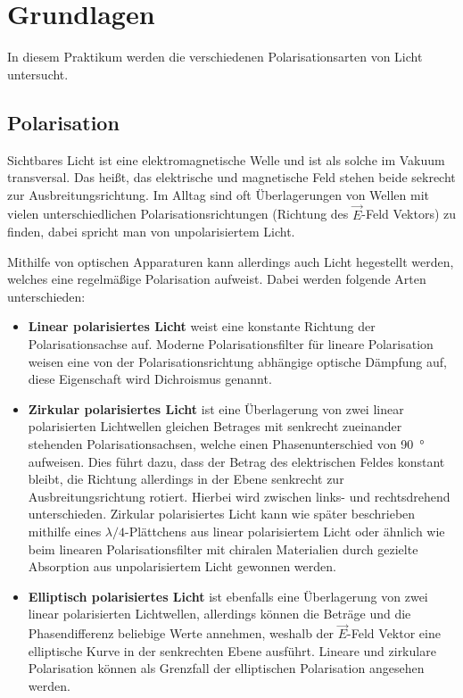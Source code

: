 \chapter{Grundlagen}

In diesem Praktikum werden die verschiedenen Polarisationsarten von Licht untersucht.

\section{Polarisation}

Sichtbares Licht ist eine elektromagnetische Welle und ist als solche im Vakuum transversal.
Das heißt, das elektrische und magnetische Feld stehen beide sekrecht zur Ausbreitungsrichtung.
Im Alltag sind oft Überlagerungen von Wellen mit vielen unterschiedlichen Polarisationsrichtungen (Richtung des $\vec{E}$-Feld Vektors) zu finden, dabei spricht man von unpolarisiertem Licht.

Mithilfe von optischen Apparaturen kann allerdings auch Licht hegestellt werden, welches eine regelmäßige Polarisation aufweist.
Dabei werden folgende Arten unterschieden:

\begin{itemize}
	\item \textbf{Linear polarisiertes Licht} weist eine konstante Richtung der Polarisationsachse auf.
	Moderne Polarisationsfilter für lineare Polarisation weisen eine von der Polarisationsrichtung abhängige optische Dämpfung auf, diese Eigenschaft wird Dichroismus genannt.
	\item \textbf{Zirkular polarisiertes Licht} ist eine Überlagerung von zwei linear polarisierten Lichtwellen gleichen Betrages mit senkrecht zueinander stehenden Polarisationsachsen, welche einen Phasenunterschied von \SI{90}{\degree} aufweisen.
	Dies führt dazu, dass der Betrag des elektrischen Feldes konstant bleibt, die Richtung allerdings in der Ebene senkrecht zur Ausbreitungsrichtung rotiert.
	Hierbei wird zwischen links- und rechtsdrehend unterschieden.
	Zirkular polarisiertes Licht kann wie später beschrieben mithilfe eines $\lambda / 4$-Plättchens aus linear polarisiertem Licht oder ähnlich wie beim linearen Polarisationsfilter mit chiralen Materialien durch gezielte Absorption aus unpolarisiertem Licht gewonnen werden.
	\item \textbf{Elliptisch polarisiertes Licht} ist ebenfalls eine Überlagerung von zwei linear polarisierten Lichtwellen, allerdings können die Beträge und die Phasendifferenz beliebige Werte annehmen, weshalb der $\vec{E}$-Feld Vektor eine elliptische Kurve in der senkrechten Ebene ausführt.
	Lineare und zirkulare Polarisation können als Grenzfall der elliptischen Polarisation angesehen werden.
\end{itemize}

